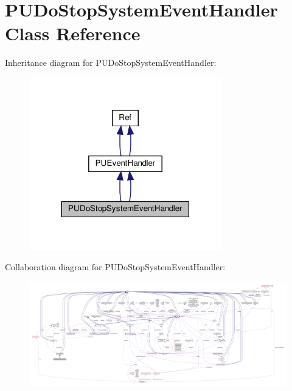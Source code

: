 \hypertarget{classPUDoStopSystemEventHandler}{}\section{P\+U\+Do\+Stop\+System\+Event\+Handler Class Reference}
\label{classPUDoStopSystemEventHandler}


Inheritance diagram for P\+U\+Do\+Stop\+System\+Event\+Handler\+:
\nopagebreak
\begin{figure}[H]
\begin{center}
\leavevmode
\includegraphics[width=237pt]{classPUDoStopSystemEventHandler__inherit__graph}
\end{center}
\end{figure}


Collaboration diagram for P\+U\+Do\+Stop\+System\+Event\+Handler\+:
\nopagebreak
\begin{figure}[H]
\begin{center}
\leavevmode
\includegraphics[width=350pt]{classPUDoStopSystemEventHandler__coll__graph}
\end{center}
\end{figure}
